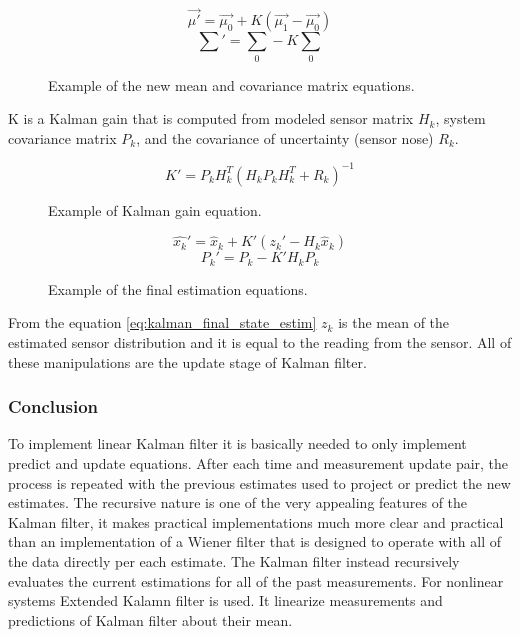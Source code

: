 \documentclass[../../main]{subfiles}
\begin{document}
\begin{figure} [!ht]
  \centering    
    \begin{equation}
       \label{eq:kalman_new_mean}
       \vec{\mu'} = \vec{\mu_0} + K(\vec{\mu_1} - \vec{\mu_0})
    \end{equation}
     \begin{equation}
       \label{eq:kalman_new_covariance}
       \textstyle
       \sum' = \sum_0 - K \sum_0
    \end{equation}
  \caption{Example of the new mean and covariance matrix equations.}
\end{figure}

K is a Kalman gain that is computed from modeled sensor matrix $H_k$, system covariance matrix $P_k$, and the covariance of uncertainty (sensor nose) $R_k$.

\begin{figure} [!ht]
  \centering    
    \begin{equation}
       K' = P_k H_k^T (H_k P_k H_k^T + R_k) ^ {-1}
    \end{equation}
  \caption{Example of Kalman gain equation.}
\end{figure}

\begin{figure} [!ht]
  \centering    
    \begin{equation}
       \label{eq:kalman_final_state_estim}
       \hat{x_k}' = \hat{x}_{k} + K' (z_k' - H_k \hat{x}_{k})
    \end{equation}
    \begin{equation}
       P_k' = P_k - K' H_k P_k
    \end{equation}
  \caption{Example of the final estimation equations.}
\end{figure}

From the equation \ref{eq:kalman_final_state_estim} $z_k$ is the mean of the estimated sensor distribution and it is equal to the reading from the sensor.
All of these manipulations are the update stage of Kalman filter.

\subsubsection*{Conclusion}

To implement linear Kalman filter it is basically needed to only implement predict and update equations. After each time and measurement update pair, the process is repeated with the previous estimates used to project or predict the new estimates. The recursive nature is one of the very appealing features of the Kalman filter, it makes practical implementations much more clear and practical than an implementation of a Wiener filter that is designed to operate with all of the data directly per each estimate. The Kalman filter instead recursively evaluates the current estimations for all of the past measurements.
For nonlinear systems Extended Kalamn filter is used. It linearize measurements and predictions of Kalman filter about their mean.
\end{document}
